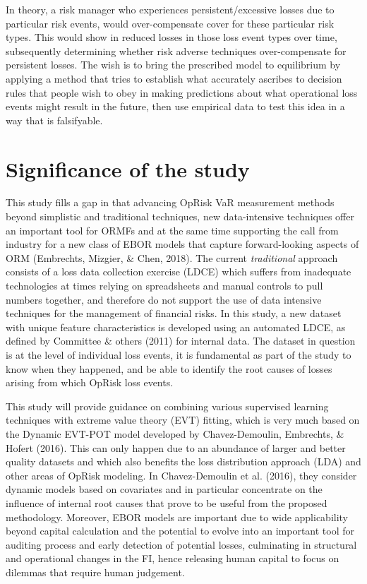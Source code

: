 \documentclass{DissertateUSU}
\begin{document}
In theory, a risk manager who experiences persistent/excessive losses
due to particular risk events, would over-compensate cover for these
particular risk types. This would show in reduced losses in those loss
event types over time, subsequently determining whether risk adverse
techniques over-compensate for persistent losses. The wish is to bring
the prescribed model to equilibrium by applying a method that tries to
establish what accurately ascribes to decision rules that people wish to
obey in making predictions about what operational loss events might
result in the future, then use empirical data to test this idea in a way
that is falsifyable.

\section{Significance of the study}
\label{sec:Significance of the study}

This study fills a gap in that advancing OpRisk VaR measurement methods
beyond simplistic and traditional techniques, new data-intensive
techniques offer an important tool for ORMFs and at the same time
supporting the call from industry for a new class of EBOR models that
capture forward-looking aspects of ORM (Embrechts, Mizgier, \& Chen,
2018). The current \emph{traditional} approach consists of a loss data
collection exercise (LDCE) which suffers from inadequate technologies at
times relying on spreadsheets and manual controls to pull numbers
together, and therefore do not support the use of data intensive
techniques for the management of financial risks. In this study, a new
dataset with unique feature characteristics is developed using an
automated LDCE, as defined by Committee \& others (2011) for internal
data. The dataset in question is at the level of individual loss events,
it is fundamental as part of the study to know when they happened, and
be able to identify the root causes of losses arising from which OpRisk
loss events.\medskip 

This study will provide guidance on combining various supervised
learning techniques with extreme value theory (EVT) fitting, which is
very much based on the Dynamic EVT-POT model developed by
Chavez-Demoulin, Embrechts, \& Hofert (2016). This can only happen due
to an abundance of larger and better quality datasets and which also
benefits the loss distribution approach (LDA) and other areas of OpRisk
modeling. In Chavez-Demoulin et al. (2016), they consider dynamic models
based on covariates and in particular concentrate on the influence of
internal root causes that prove to be useful from the proposed
methodology. Moreover, EBOR models are important due to wide
applicability beyond capital calculation and the potential to evolve
into an important tool for auditing process and early detection of
potential losses, culminating in structural and operational changes in
the FI, hence releasing human capital to focus on dilemmas that require
human judgement.
\end{document}
